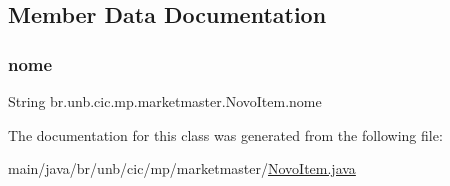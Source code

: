 \subsection{Member Data Documentation}
\mbox{\label{classbr_1_1unb_1_1cic_1_1mp_1_1marketmaster_1_1NovoItem_aad525529a4cc862db37990ffa93df983}} 
\subsubsection{\texorpdfstring{nome}{nome}}
{\footnotesize\ttfamily String br.\+unb.\+cic.\+mp.\+marketmaster.\+Novo\+Item.\+nome\hspace{0.3cm}{\ttfamily [private]}}



The documentation for this class was generated from the following file\+:\begin{DoxyCompactItemize}
\item 
main/java/br/unb/cic/mp/marketmaster/\mbox{\hyperlink{NovoItem_8java}{Novo\+Item.\+java}}\end{DoxyCompactItemize}
